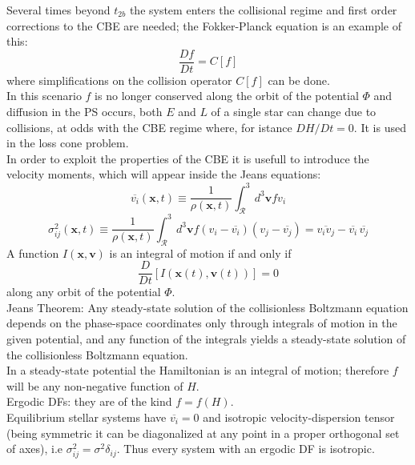 \documentclass[12pt,twoside,openany]{book}
\begin{document}
Several times beyond $t_{2b}$ the system enters the collisional regime and first order 
corrections to the CBE are needed; the Fokker-Planck equation is an example of this:
\begin{equation}
    \frac{Df}{Dt}=C[f]
\end{equation}
where simplifications on the collision operator $C[f]$ can be done.\\In this scenario $f$ is 
no longer conserved along the orbit of the potential $\Phi$ and diffusion in the PS occurs, 
both $E$ and $L$ of a single star can change due to collisions, at odds with the CBE regime 
where, for istance $DH/Dt=0$. It is used in the loss cone problem.\\In order to exploit the 
properties of the CBE it is usefull to introduce the velocity moments, which will appear 
inside the Jeans equations:
\begin{equation}
    \overline{v_i}(\mathbf{x},t)\equiv 
    \frac{1}{\rho(\mathbf{x},t)}\int_\mathcal{R}^3 d^3 \mathbf{v} f v_i
\end{equation}
\begin{equation}
    \sigma_{ij}^2(\mathbf{x},t)\equiv 
    \frac{1}{\rho(\mathbf{x},t)}\int_\mathcal{R}^3 d^3 \mathbf{v}
    f (v_i-\overline{v_i})(v_j-\overline{v_j})=\overline{v_iv_j}-
    \overline{v_i}\,\overline{v_j}
\end{equation}
A function $I(\mathbf{x},\mathbf{v})$
is an integral of motion if and only if
\begin{equation}\label{Integral of motion def}
    \frac{D}{Dt}[I(\mathbf{x}(t),\mathbf{v}(t))]=0
\end{equation}
along any orbit of the potential $\Phi$.
\\Jeans Theorem: 
Any steady-state solution of the collisionless Boltzmann equation depends on 
the phase-space coordinates only through integrals of motion in the given potential, and any 
function of the integrals yields a steady-state solution of the collisionless Boltzmann 
equation.\\In a steady-state potential the Hamiltonian is an integral of motion; therefore $f$
will be any non-negative function of $H$.
\\Ergodic DFs: they are of the kind $f=f(H)$.
\\Equilibrium stellar systems have $\overline{v_i}=0$ and isotropic velocity-dispersion tensor
(being symmetric it can be diagonalized at any point in a proper orthogonal set of axes), i.e 
$\sigma^2_{ij}=\sigma^2 \delta_{ij}$. Thus every system with an ergodic DF is isotropic.
\end{document}
